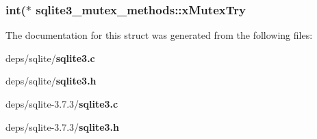 \subsubsection{\setlength{\rightskip}{0pt plus 5cm}int($\ast$ \bf{sqlite3\_\-mutex\_\-methods::x\-Mutex\-Try}}\label{structsqlite3__mutex__methods_4c21813b959cfd9b4edec5eda8c45db2}




The documentation for this struct was generated from the following files:\begin{CompactItemize}
\item 
deps/sqlite/\bf{sqlite3.c}\item 
deps/sqlite/\bf{sqlite3.h}\item 
deps/sqlite-3.7.3/\bf{sqlite3.c}\item 
deps/sqlite-3.7.3/\bf{sqlite3.h}\end{CompactItemize}
